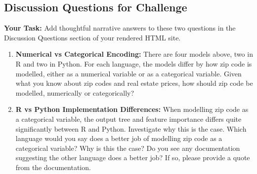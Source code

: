 \documentclass[
  letterpaper,
  DIV=11,
  numbers=noendperiod]{scrartcl}
\begin{document}
\subsection{Discussion Questions for
Challenge}\label{discussion-questions-for-challenge}

\textbf{Your Task:} Add thoughtful narrative answers to these two
questions in the Discussion Questions section of your rendered HTML
site.

\begin{enumerate}
\def\labelenumi{\arabic{enumi}.}
\item
  \textbf{Numerical vs Categorical Encoding:} There are four models
  above, two in R and two in Python. For each language, the models
  differ by how zip code is modelled, either as a numerical variable or
  as a categorical variable. Given what you know about zip codes and
  real estate prices, how should zip code be modelled, numerically or
  categorically?
\item
  \textbf{R vs Python Implementation Differences:} When modelling zip
  code as a categorical variable, the output tree and feature importance
  differs quite significantly between R and Python. Investigate why this
  is the case. Which language would you say does a better job of
  modelling zip code as a categorical variable? Why is this the case? Do
  you see any documentation suggesting the other language does a better
  job? If so, please provide a quote from the documentation.
\end{enumerate}
\end{document}
